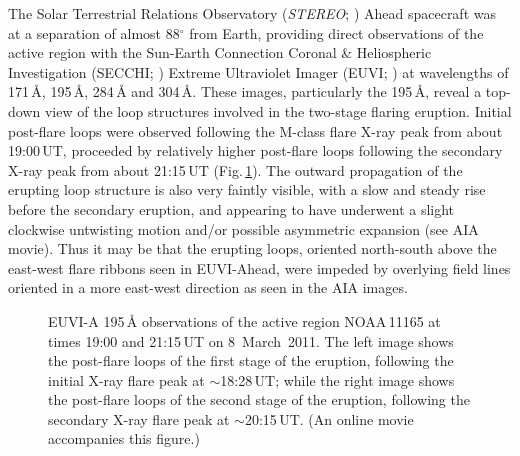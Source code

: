 \documentclass[namedreferences]{solarphysics}
\begin{document}
\begin{article}
The Solar Terrestrial Relations Observatory (\emph{STEREO}; ) Ahead spacecraft was at a separation of almost 88$^{\circ}$ from Earth, providing direct observations of the active region with the Sun-Earth Connection Coronal \& Heliospheric Investigation (SECCHI; ) Extreme Ultraviolet Imager (EUVI; ) at wavelengths of 171\,{\AA}, 195\,{\AA}, 284\,{\AA} and 304\,{\AA}. These images, particularly the 195\,{\AA}, reveal a top-down view of the loop structures involved in the two-stage flaring eruption. Initial post-flare loops were observed following the M-class flare X-ray peak from about 19:00\,UT, proceeded by relatively higher post-flare loops following the secondary X-ray peak from about 21:15\,UT (Fig.\,\ref{euvi}). The outward propagation of the erupting loop structure is also very faintly visible, with a slow and steady rise before the secondary eruption, and appearing to have underwent a slight clockwise untwisting motion and/or possible asymmetric expansion (see AIA movie). Thus it may be that the erupting loops, oriented north-south above the east-west flare ribbons seen in EUVI-Ahead, were impeded by overlying field lines oriented in a more east-west direction as seen in the AIA images.

\begin{figure}[!t]
\caption{EUVI-A 195\,{\AA} observations of the active region NOAA\,11165 at times 19:00 and 21:15\,UT on 8~March~2011. The left image shows the post-flare loops of the first stage of the eruption, following the initial X-ray flare peak at $\sim$18:28\,UT; while the right image shows the post-flare loops of the second stage of the eruption, following the secondary X-ray flare peak at $\sim$20:15\,UT. (An online movie accompanies this figure.)}
\label{euvi}
\end{figure}


\end{article}
\end{document}
